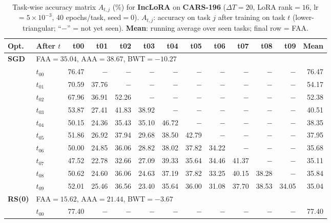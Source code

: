 \begin{table}[ht]
\centering
\caption{%
  Task-wise accuracy matrix $A_{t,j}$ (\%) for \textbf{IncLoRA} on \textbf{CARS-196} ($\Delta T=20$, LoRA rank$=16$, lr$=5\times10^{-3}$, 40 epochs/task, seed$=0$).
  $A_{t,j}$: accuracy on task $j$ after training on task $t$  (lower-triangular; ``$-$'' = not yet seen).
  \textbf{Mean}: running average over seen tasks; final row = FAA.
}
\label{tab:raw_inclora_cars196}
\setlength{\tabcolsep}{2.8pt}
\renewcommand{\arraystretch}{0.88}
\scriptsize
\begin{tabular}{@{}l l r r r r r r r r r r r@{}}
\toprule
\textbf{Opt.} & \textbf{After $t$} & \textbf{t00} & \textbf{t01} & \textbf{t02} & \textbf{t03} & \textbf{t04} & \textbf{t05} & \textbf{t06} & \textbf{t07} & \textbf{t08} & \textbf{t09} & \textbf{Mean} \\
\midrule
\multirow{11}{*}{\textbf{SGD}} & \multicolumn{12}{l}{\quad\small FAA$=35.04$,\; AAA$=38.67$,\; BWT$=-10.27$} \\
 & $t_{00}$ & 76.47 & $-$ & $-$ & $-$ & $-$ & $-$ & $-$ & $-$ & $-$ & $-$ & 76.47 \\
 & $t_{01}$ & 70.59 & 37.76 & $-$ & $-$ & $-$ & $-$ & $-$ & $-$ & $-$ & $-$ & 54.17 \\
 & $t_{02}$ & 67.96 & 36.91 & 52.26 & $-$ & $-$ & $-$ & $-$ & $-$ & $-$ & $-$ & 52.38 \\
 & $t_{03}$ & 53.87 & 27.41 & 41.83 & 38.92 & $-$ & $-$ & $-$ & $-$ & $-$ & $-$ & 40.51 \\
 & $t_{04}$ & 50.15 & 24.36 & 35.43 & 35.10 & 46.72 & $-$ & $-$ & $-$ & $-$ & $-$ & 38.35 \\
 & $t_{05}$ & 51.86 & 26.92 & 37.94 & 29.68 & 38.50 & 42.79 & $-$ & $-$ & $-$ & $-$ & 37.95 \\
 & $t_{06}$ & 50.00 & 24.85 & 36.06 & 28.82 & 38.02 & 37.82 & 34.22 & $-$ & $-$ & $-$ & 35.68 \\
 & $t_{07}$ & 47.52 & 22.78 & 32.66 & 27.09 & 39.33 & 35.64 & 34.46 & 41.37 & $-$ & $-$ & 35.11 \\
 & $t_{08}$ & 50.62 & 24.60 & 36.06 & 24.63 & 37.19 & 37.82 & 33.25 & 40.15 & 38.28 & $-$ & 35.84 \\
 & $t_{09}$ & 52.01 & 25.46 & 36.56 & 23.40 & 35.64 & 36.00 & 31.08 & 37.70 & 38.53 & 34.05 & 35.04 \\
\midrule
\multirow{11}{*}{\textbf{RS(0)}} & \multicolumn{12}{l}{\quad\small FAA$=15.62$,\; AAA$=21.44$,\; BWT$=-3.67$} \\
 & $t_{00}$ & 77.40 & $-$ & $-$ & $-$ & $-$ & $-$ & $-$ & $-$ & $-$ & $-$ & 77.40 \\

\end{tabular}
\end{table}
